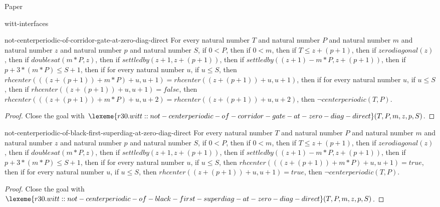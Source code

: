 \begin{lexlean}{Paper}
\begin{section}{witt-interfaces}
  \begin{theorem}{not-centerperiodic-of-corridor-gate-at-zero-diag-direct}
  For every natural number \(T\) and natural number \(P\) and natural number \(m\) and natural number \(z\) and natural number \(p\) and natural number \(S\), if \(0 < P\), then if \(0 < m\), then if \(T ≤ z + (p + 1)\), then if \(zerodiagonal(z)\), then if \(doublesat(m * P, z)\), then if \(settledby(z + 1, z + (p + 1))\), then if \(settledby((z + 1) - m * P, z + (p + 1))\), then if \(p + 3 * (m * P) ≤ S + 1\), then if for every natural number \(u\), if \(u ≤ S\), then \(rhcenter(((z + (p + 1)) + m * P) + u, u + 1) = rhcenter((z + (p + 1)) + u, u + 1)\), then if for every natural number \(u\), if \(u ≤ S\), then if \(rhcenter((z + (p + 1)) + u, u + 1) = false\), then \(rhcenter(((z + (p + 1)) + m * P) + u, u + 2) = rhcenter((z + (p + 1)) + u, u + 2)\), then \(¬ centerperiodic(T, P)\).
  \begin{proof}
  Close the goal with \(\lexeme{r30.witt::not-centerperiodic-of-corridor-gate-at-zero-diag-direct}(T, P, m, z, p, S)\).
  \end{proof}
  \end{theorem}

  \begin{theorem}{not-centerperiodic-of-black-first-superdiag-at-zero-diag-direct}
  For every natural number \(T\) and natural number \(P\) and natural number \(m\) and natural number \(z\) and natural number \(p\) and natural number \(S\), if \(0 < P\), then if \(0 < m\), then if \(T ≤ z + (p + 1)\), then if \(zerodiagonal(z)\), then if \(doublesat(m * P, z)\), then if \(settledby(z + 1, z + (p + 1))\), then if \(settledby((z + 1) - m * P, z + (p + 1))\), then if \(p + 3 * (m * P) ≤ S + 1\), then if for every natural number \(u\), if \(u ≤ S\), then \(rhcenter(((z + (p + 1)) + m * P) + u, u + 1) = true\), then if for every natural number \(u\), if \(u ≤ S\), then \(rhcenter((z + (p + 1)) + u, u + 1) = true\), then \(¬ centerperiodic(T, P)\).
  \begin{proof}
  Close the goal with \(\lexeme{r30.witt::not-centerperiodic-of-black-first-superdiag-at-zero-diag-direct}(T, P, m, z, p, S)\).
  \end{proof}
  \end{theorem}


\end{section}
\end{lexlean}
